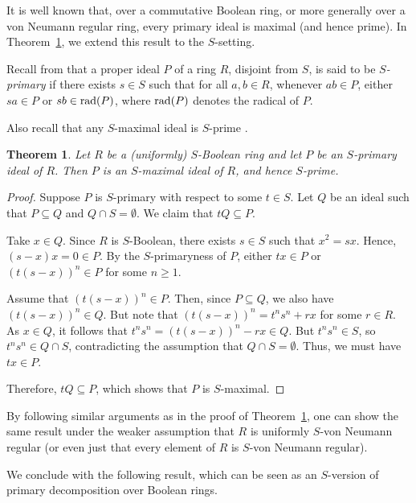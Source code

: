 \documentclass[12pt]{article}
\newtheorem{thm}{\bf Theorem}[section]
\def\rad{{\rm rad}}
\begin{document}

It is well known that, over a commutative Boolean ring, or more generally over a von Neumann regular ring, every primary ideal is maximal (and hence prime). In Theorem~\ref{pri-max-bool}, we extend this result to the $S$-setting.

Recall from \cite[Definition~2.1]{me22} that a proper ideal \(P\) of a ring \(R\), disjoint from \(S\), is said to be \emph{\(S\)-primary} if there exists \(s \in S\) such that for all \(a, b \in R\), whenever \(ab \in P\), either \(sa \in P\) or \(sb \in \rad(P)\), where \(\rad(P)\) denotes the radical of \(P\).

Also recall that any $S$-maximal ideal is $S$-prime \cite[Proposition 10]{Yil1}.

\begin{thm}\label{pri-max-bool}
Let $R$ be a (uniformly) $S$-Boolean ring and let $P$ be an $S$-primary ideal of $R$. Then $P$ is an $S$-maximal ideal of $R$, and hence $S$-prime.
\end{thm}
\begin{proof}
Suppose \(P\) is \(S\)-primary with respect to some \(t \in S\). Let \(Q\) be an ideal such that \(P \subseteq Q\) and \(Q \cap S = \emptyset\).  We claim that \(tQ \subseteq P\).  

Take \(x \in Q\). Since \(R\) is \(S\)-Boolean, there exists \(s \in S\) such that \(x^{2} = sx\).  
Hence, \((s-x)x = 0 \in P\). By the \(S\)-primaryness of \(P\), either \(tx \in P\) or \((t(s-x))^n \in P\) for some \(n \geq 1\).  

Assume that \((t(s-x))^n \in P\). Then, since \(P \subseteq Q\), we also have \((t(s-x))^n \in Q\).  
But note that $(t(s-x))^n = t^n s^n + r x$ for some \(r \in R\).   As \(x \in Q\), it follows that \(t^ns^n = (t(s-x))^n - rx \in Q\).  But \(t^ns^n \in S\), so \(t^ns^n \in Q \cap S\), contradicting the assumption that \(Q \cap S = \emptyset\).  Thus, we must have $tx \in P$.  

Therefore, \(tQ \subseteq P\), which shows that \(P\) is \(S\)-maximal.
\end{proof}

\noindent
By following similar arguments as in the proof of Theorem~\ref{pri-max-bool}, one can show the same result under the weaker assumption that $R$ is uniformly $S$-von Neumann regular (or even just that every element of $R$ is $S$-von Neumann regular).  

We conclude with the following result, which can be seen as an $S$-version of primary decomposition over Boolean rings.
\end{document}
